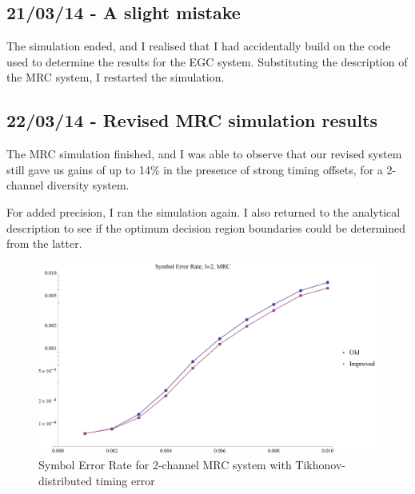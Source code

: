 \subsection{21/03/14 - A slight mistake}

The simulation ended, and I realised that I had accidentally build on the
code used to determine the results for the EGC system. Substituting the
description of the MRC system, I restarted the simulation.

\subsection{22/03/14 - Revised MRC simulation results}

The MRC simulation finished, and I was able to observe that our revised
system still gave us gains of up to 14\% in the presence of strong
timing offsets, for a 2-channel diversity system.

For added precision, I ran the simulation again. I also returned to the
analytical description to see if the optimum decision region boundaries
could be determined from the latter.

\begin{figure}[htbp]
\centering
\includegraphics[width=\linewidth]{../../../plots/MRC_SER.png}
\caption{Symbol Error Rate for 2-channel MRC system with
Tikhonov-distributed timing error}
\end{figure}